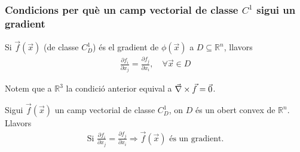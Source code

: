 \subsubsection*{Condicions per què un camp vectorial de classe $C^{1}$ sigui un gradient}
\begin{thm}
    Si $\vec{f}(\vec{x})$ (de classe $C^{1}_{D}$) és el gradient de $\phi(\vec{x})$ a $D \subseteq \mathbb{R}^{n}$, llavors
    \begin{align}
        \frac{\partial f_{i}}{\partial x_{j}} = \frac{\partial f_{j}}{\partial x_{i}}, \quad \forall \vec{x} \in D
    \end{align}
\end{thm}
Notem que a $\mathbb{R}^{3}$ la condició anterior equival a $\vec{\nabla} \times \vec{f} = \vec{0}$.

\begin{thm}
    Sigui $\vec{f}(\vec{x})$ un camp vectorial de classe $C^{1}_{D}$, on $D$ és un obert convex de $\mathbb{R}^{n}$. Llavors
    \begin{align}
        \text{Si } \frac{\partial f_{i}}{\partial x_{j}} = \frac{\partial f_{j}}{\partial x_{i}} \Rightarrow \vec{f}(\vec{x}) \text{ és un gradient.}
    \end{align}
\end{thm}

